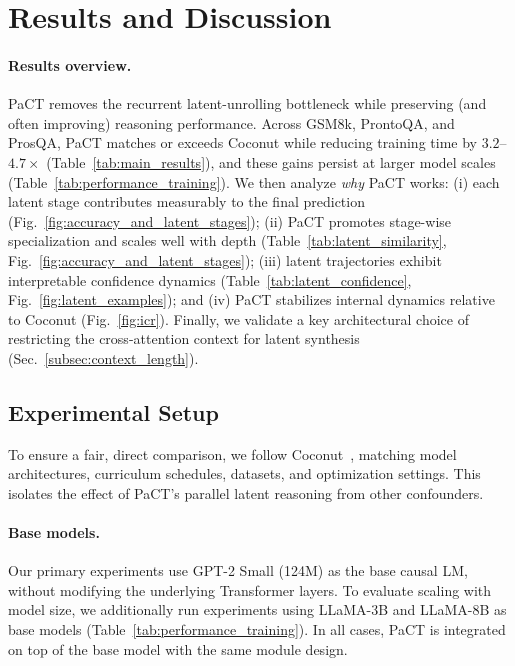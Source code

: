 \section{Results and Discussion}
\label{sec:results}

\paragraph{Results overview.}
PaCT removes the recurrent latent-unrolling bottleneck while preserving (and often improving) reasoning performance.
Across GSM8k, ProntoQA, and ProsQA, PaCT matches or exceeds Coconut while reducing training time by $3.2$--$4.7\times$
(Table~\ref{tab:main_results}), and these gains persist at larger model scales (Table~\ref{tab:performance_training}).
We then analyze \emph{why} PaCT works: (i) each latent stage contributes measurably to the final prediction
(Fig.~\ref{fig:accuracy_and_latent_stages}); (ii) PaCT promotes stage-wise specialization and scales well with depth
(Table~\ref{tab:latent_similarity}, Fig.~\ref{fig:accuracy_and_latent_stages}); (iii) latent trajectories exhibit
interpretable confidence dynamics (Table~\ref{tab:latent_confidence}, Fig.~\ref{fig:latent_examples});
and (iv) PaCT stabilizes internal dynamics relative to Coconut (Fig.~\ref{fig:icr}).
Finally, we validate a key architectural choice of restricting the cross-attention context for latent synthesis
(Sec.~\ref{subsec:context_length}).

\subsection{Experimental Setup}
\label{sec:experimental_setup}
To ensure a fair, direct comparison, we follow Coconut~\cite{hao2024training}, matching
model architectures, curriculum schedules, datasets, and optimization settings. This isolates the effect of PaCT’s
parallel latent reasoning from other confounders.
\vspace{-4mm}
\paragraph{Base models.}
Our primary experiments use GPT-2 Small (124M) as the base causal LM, without modifying the underlying Transformer
layers. To evaluate scaling with model size, we additionally run experiments using LLaMA-3B and LLaMA-8B as base
models (Table~\ref{tab:performance_training}). In all cases, PaCT is integrated on top of the base model with the
same module design.
\vspace{-4mm}
